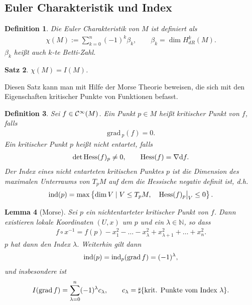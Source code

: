 \documentclass[12pt,a4paper]{article}
\def\N{\mathbb{N}}
\def\#{\sharp}
\def\grad{\mathrm{grad}\,}
\newtheorem{Lemma}{Lemma}[section]
\newtheorem{Satz}[Lemma]{Satz}
\newtheorem{Definition}[Lemma]{Definition}
\begin{document}
\subsection{Euler Charakteristik und Index}

\begin{Definition}
Die \emph{Euler Charakteristik} von $M$ ist definiert als
\begin{align*}
\chi(M) := \sum_{k=0}^n (-1)^k \beta_k,\qquad \beta_k = \dim
H_{dR}^k(M).
\end{align*}
$\beta_k$ hei\ss{}t auch \emph{$k$-te Betti-Zahl}.
\end{Definition}

\bigskip

\begin{Satz}
\label{Euler-Index}
$\chi(M) = I(M)$.
\end{Satz}

Diesen Satz kann man mit Hilfe der Morse Theorie beweisen, die sich mit den
Eigenschaften kritischer Punkte von Funktionen befasst.

\bigskip

\begin{Definition}
Sei $f\in\mathcal{C}^\infty(M)$. Ein Punkt $p\in M$ hei\ss{}t \emph{kritischer Punkt} von
$f$, falls
\begin{align*}
\grad_p(f) = 0.
\end{align*} 
Ein kritischer Punkt $p$ hei\ss{}t \emph{nicht entartet}, falls 
\begin{align*}
\det \mathrm{Hess}(f)_p \neq 0,\qquad \mathrm{Hess}(f) = \nabla \mathrm{d}f.
\end{align*}
Der \emph{Index} eines nicht entarteten kritischen Punktes $p$ ist die Dimension
des maximalen Unterraums von $T_pM$ auf dem die Hessische negativ definit ist, d.h.
\begin{align*}
\mathrm{ind}(p) = \max\left\{\dim V\;|\; V\le T_pM,\quad \mathrm{Hess}(f)_p\big|_V \le 0\right\}.
\end{align*} 
\end{Definition}

\bigskip

\begin{Lemma}[Morse]
Sei $p$ ein nichtentarteter kritischer Punkt von $f$. Dann existieren lokale
Koordinaten $(U,x)$ um $p$ und ein $\lambda\in\N$, so dass
\begin{align*}
f\circ x^{-1} = f(p) - x_1^2 - \ldots - x_\lambda^2 + x_{\lambda+1}^2 + \ldots +
x_n^2.
\end{align*} 
$p$ hat dann den Index $\lambda$. Weiterhin gilt dann
\begin{align*}
\ind(p) = \ind_p(\grad f) = (-1)^\lambda,
\end{align*}
und insbesondere ist
\begin{align*}
I(\grad f ) = \sum_{\lambda = 0}^n (-1)^\lambda c_\lambda,\qquad
c_\lambda = \#\setd{\text{krit. Punkte vom Index }\lambda}.
\end{align*}
\end{Lemma}
\end{document}
